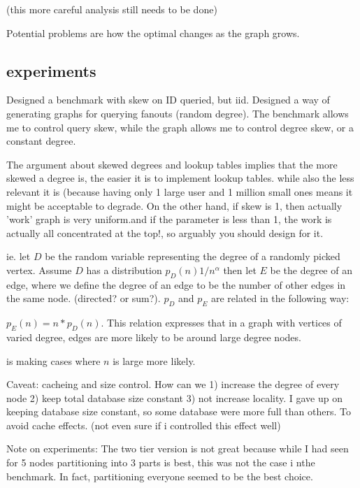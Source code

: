 \documentclass[11pt]{article}
\begin{document}
(this more careful analysis still needs to be done)

Potential problems are how the optimal changes as the graph grows.


\subsection{experiments}

Designed a benchmark with skew on ID queried, but iid. Designed a way of generating graphs for querying fanouts (random degree). The benchmark allows me to control 
query skew, while the graph allows me to control degree skew, or a constant degree.

The argument about skewed degrees and lookup tables implies that the more skewed a degree is, the easier it is to implement lookup tables. while also the less relevant it is
(because having only 1 large user and 1 million small ones means it might be acceptable to degrade. On the other hand, if skew is 1, then actually 'work' graph is very uniform.and if the parameter is less than 1, the work is actually all concentrated at the top!, so arguably you should design for it.

ie. let  \(D\) be the random variable representing the degree of a randomly picked vertex. Assume \(D\) has a distribution \(p_D(n) 1/n^\alpha \) then let \(E \) be the degree of an edge, where we define the degree of an edge to be the number of other edges in the same node. (directed? or sum?). \(p_D \) and  \(p_E \) are related in the following way:

\( p_E(n) = n*p_D(n)\). This relation expresses that in a graph with vertices of varied degree, edges are more likely to be around large degree nodes. 



 is making cases where \(n \) is large more likely. 

Caveat: cacheing and size control. How can we 1) increase the degree of every node 2) keep total database size constant 3) not increase locality.
I gave up on keeping database size constant, so some database were more full than others. To avoid cache effects. (not even sure if i controlled this effect well)

Note on experiments:
The two tier version is not great because while I had seen for 5 nodes partitioning into 3 parts is best, this was not the case i nthe benchmark.
In fact, partitioning everyone seemed to be the best choice.
\end{document}
